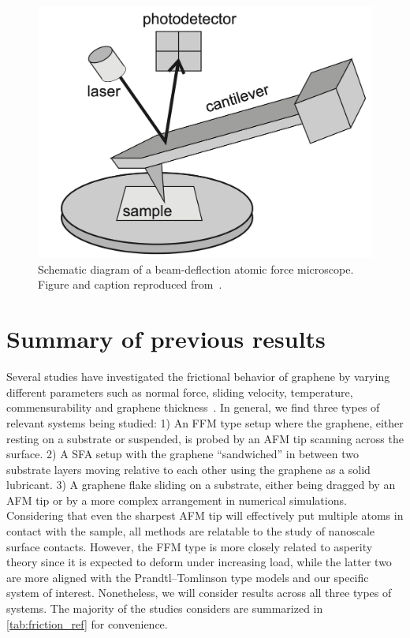 \begin{figure}[!htb]
  \centering
  \includegraphics[width=0.5\linewidth]{figures/theory/AFM.png}
  \caption{Schematic diagram of a beam-deflection atomic force microscope. Figure and caption reproduced from~\cite[p. 184]{gnecco_meyer_2015}.}
  \label{fig:AFM}
\end{figure}



\section{Summary of previous results}\label{sec:prev_results}
Several studies have investigated the frictional behavior of graphene by varying
different parameters such as normal force, sliding velocity, temperature,
commensurability and graphene thickness~\cite{penkov_tribology_2014}. In
general, we find three types of relevant systems being studied: 1) An
\acrshort{FFM} type setup where the graphene, either resting on a substrate or
suspended, is probed by an \acrshort{AFM} tip scanning across the surface. 2) A
\acrshort{SFA} setup with the graphene ``sandwiched'' in between two substrate
layers moving relative to each other using the graphene as a solid lubricant. 3)
A graphene flake sliding on a substrate, either being dragged by an
\acrshort{AFM} tip or by a more complex arrangement in numerical simulations.
Considering that even the sharpest \acrshort{AFM} tip will effectively put
multiple atoms in contact with the sample, all methods are relatable to the
study of nanoscale surface contacts. However, the \acrshort{FFM} type is more
closely related to asperity theory since it is expected to deform under
increasing load, while the latter two are more aligned with the
Prandtl–Tomlinson type models and our specific system of interest. Nonetheless,
we will consider results across all three types of systems. The majority of the studies considers are summarized in \cref{tab:friction_ref} for convenience. 


